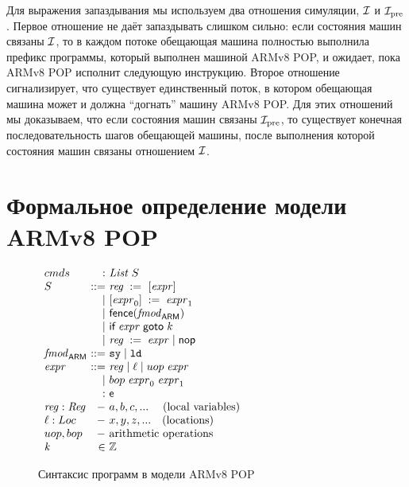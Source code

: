 Для выражения запаздывания мы используем два отношения симуляции, $\mathcal{I}$ и $\mathcal{I}_{\textup{\rm pre}}$.
Первое отношение не даёт запаздывать слишком сильно: если состояния машин связаны $\mathcal{I}$,
то в каждом потоке обещающая машина полностью выполнила префикс программы, который выполнен машиной ARMv8 POP,
и ожидает, пока ARMv8 POP исполнит следующую инструкцию.
Второе отношение сигнализирует, что существует единственный поток, в котором обещающая машина
может и должна ``догнать'' машину ARMv8 POP.
Для этих отношений мы доказываем, что если состояния машин связаны $\mathcal{I}_{\textup{\rm pre}}$, то существует
конечная последовательность шагов обещающей машины, после выполнения которой состояния машин связаны отношением $\mathcal{I}$.

\section{Формальное определение модели ARMv8 POP}
\label{sec:armpop:armmodel}

\begin{figure}
  \begin{center}
$\begin{array}{l @{~} r @{~} l}
\Carm    & : & \ListOf{\StmtARM} \\  
\StmtARM & ::= & \readInst{\reg}{\expr} \\
         & |   & \writeInst{\expr_0}{\expr_1} \\
         & |   & \fenceInst{\Ftype} \\
         & |   & \ifGotoInst{\expr}{\z} \\
         & |   & \assignInst{\reg}{\expr} \mid \nop \\
\Ftype   & ::= & \SY \mid \LD\\
\expr    & ::= & \reg \mid \loc \mid uop \; \expr \\
         & |   & bop \; \expr_0 \; \expr_1 \\
         & :   & \Expr \\
\reg : \Reg & - & a, b, c, ...  \quad \; \text{(local variables)} \\
\loc : \Loc & - & x, y, z, ... \quad \text{(locations)} \\
uop, bop & - & \text{arithmetic operations} \\
\z       & \in & \mathbb{Z}
\end{array}$
  \end{center}
\caption{Синтаксис программ в модели ARMv8 POP}
\label{fig:syn-arm}
\end{figure}

